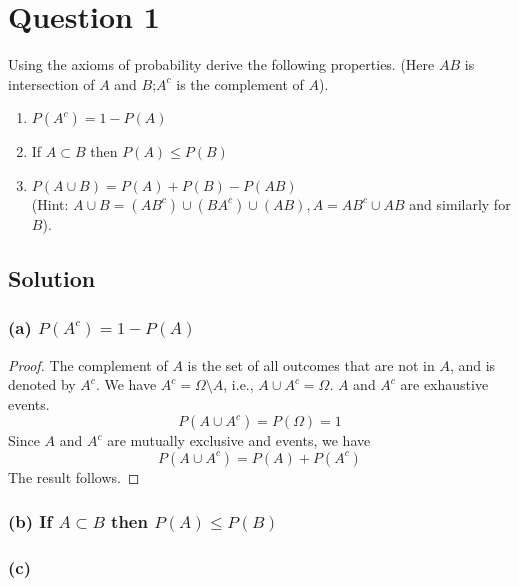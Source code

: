 \section*{Question 1}

Using the axioms of probability derive the following properties.
(Here \(AB\) is intersection of \(A\) and \(B\);\@ \(A^c\) is the complement of \(A\)).

\begin{enumerate}[label = (\alph*)]
    \item \( P(A^c)=1 - P(A) \)
    \item If \( A \subset B \) then \( P(A) \leq P(B) \)
    \item \( P(A\cup B)=P(A)+P(B)-P(AB) \) \\
          (Hint: \( A\cup B = (AB^c)\cup(BA^c)\cup(AB), A = AB^c \cup AB \) and similarly for \( B \)).
\end{enumerate}

\subsection*{Solution}

\subsubsection*{(a) \( P(A^c)=1 - P(A) \)}

\begin{proof}
    The complement of \(A\) is the set of all outcomes that are not in \(A\), and is denoted by \(A^c\).
    We have \(A^c = \Omega \setminus A\), i.e., \(A \cup A^c = \Omega \).
    \(A\) and \(A^c\) are exhaustive events.
    \begin{equation}
        P \left( A \cup A^c \right) = P \left( \Omega \right) = 1
    \end{equation}
    Since \(A\) and \(A^c\) are mutually exclusive and events, we have
    \begin{equation}
        P \left( A \cup A^c \right) = P(A) + P(A^c)
    \end{equation}
    The result follows.
\end{proof}

\subsubsection*{(b) If \( A \subset B \) then \( P(A) \leq P(B) \)}

\subsubsection*{(c)}
